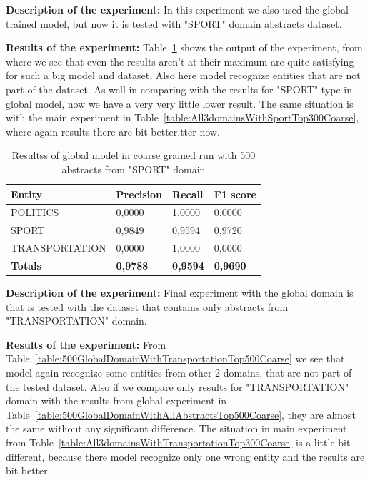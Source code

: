 \documentclass[thesis=M,english]{FITthesis}[2018/05/30]
\begin{document}
\textbf{Description of the experiment:} In this experiment we also used the global trained model, but now it is tested with "SPORT" domain abstracts dataset.

	\textbf{Results of the experiment:} Table~\ref{table:500GlobalDomainWithSportTop500Coarse} shows the output of the experiment, from where we see that even the results aren't at their maximum are quite satisfying for such a big model and dataset. Also here model recognize entities that are not part of the dataset. As well in comparing with the results for "SPORT" type in global model, now we have a very very little lower result. The same situation is with the main experiment in Table~\ref{table:All3domainsWithSportTop300Coarse}, where again results there are bit better.tter now.

	\begin{table}[H]\centering
		\begin{tabular}{|l|l|l|l|}
			\hline {\textbf{Entity}} & {\textbf{Precision}} & {\textbf{Recall}} & {\textbf{F1 score}}\\\hline
				POLITICS & 0,0000 & 1,0000 & 0,0000\\
				SPORT & 0,9849 & 0,9594 & 0,9720\\
				TRANSPORTATION & 0,0000 & 1,0000 & 0,0000\\\hline
				\textbf{Totals} & \textbf{0,9788} & \textbf{0,9594} & \textbf{0,9690}\\\hline
		\end{tabular}
		\caption{Resultss of global model in coarse grained run with 500 abstracts from "SPORT" domain \label{table:500GlobalDomainWithSportTop500Coarse}}
	\end{table}	

	\textbf{Description of the experiment:} Final experiment with the global domain is that is tested with the dataset that contains only abstracts from "TRANSPORTATION" domain.

	\textbf{Results of the experiment:} From Table~\ref{table:500GlobalDomainWithTransportationTop500Coarse} we see that model again recognize some entities from other 2 domains, that are not part of the tested dataset. Also if we compare only results for "TRANSPORTATION" domain with the results from global experiment in Table~\ref{table:500GlobalDomainWithAllAbstractsTop500Coarse}, they are almost the same without any significant difference. The situation in main experiment from Table~\ref{table:All3domainsWithTransportationTop300Coarse} is a little bit different, because there model recognize only one wrong entity and the results are bit better.
	
\end{document}
